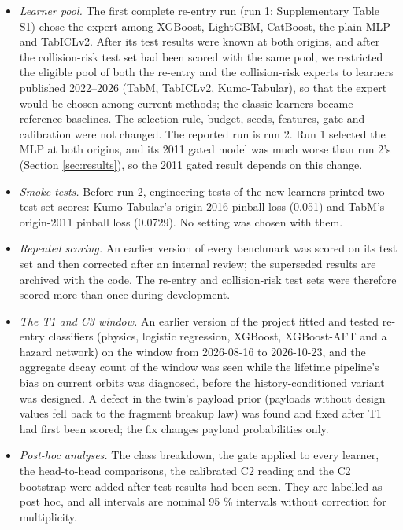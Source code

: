 \documentclass[
]{article}
\providecommand{\tightlist}{%
  \setlength{\itemsep}{0pt}\setlength{\parskip}{0pt}}
\begin{document}
\begin{itemize}
\tightlist
\item
  \emph{Learner pool.} The first complete re-entry run (run 1;
  Supplementary Table S1) chose the expert among XGBoost, LightGBM,
  CatBoost, the plain MLP and TabICLv2. After its test results were
  known at both origins, and after the collision-risk test set had been
  scored with the same pool, we restricted the eligible pool of both the
  re-entry and the collision-risk experts to learners published
  2022--2026 (TabM, TabICLv2, Kumo-Tabular), so that the expert would be
  chosen among current methods; the classic learners became reference
  baselines. The selection rule, budget, seeds, features, gate and
  calibration were not changed. The reported run is run 2. Run 1
  selected the MLP at both origins, and its 2011 gated model was much
  worse than run 2's (Section \ref{sec:results}), so the 2011 gated
  result depends on this change.
\item
  \emph{Smoke tests.} Before run 2, engineering tests of the new
  learners printed two test-set scores: Kumo-Tabular's origin-2016
  pinball loss (0.051) and TabM's origin-2011 pinball loss (0.0729). No
  setting was chosen with them.
\item
  \emph{Repeated scoring.} An earlier version of every benchmark was
  scored on its test set and then corrected after an internal review;
  the superseded results are archived with the code. The re-entry and
  collision-risk test sets were therefore scored more than once during
  development.
\item
  \emph{The T1 and C3 window.} An earlier version of the project fitted
  and tested re-entry classifiers (physics, logistic regression,
  XGBoost, XGBoost-AFT and a hazard network) on the window from
  2026-08-16 to 2026-10-23, and the aggregate decay count of the window
  was seen while the lifetime pipeline's bias on current orbits was
  diagnosed, before the history-conditioned variant was designed. A
  defect in the twin's payload prior (payloads without design values
  fell back to the fragment breakup law) was found and fixed after T1
  had first been scored; the fix changes payload probabilities only.
\item
  \emph{Post-hoc analyses.} The class breakdown, the gate applied to
  every learner, the head-to-head comparisons, the calibrated C2 reading
  and the C2 bootstrap were added after test results had been seen. They
  are labelled as post hoc, and all intervals are nominal 95 \%
  intervals without correction for multiplicity.
\end{itemize}
\end{document}
